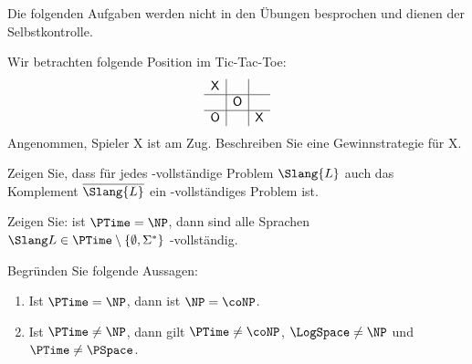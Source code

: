 \documentclass[german]{latteachCD}[2017/03/28]
\begin{document}
\maketitle

\begin{mdframed}
  Die folgenden Aufgaben werden nicht in den Übungen besprochen und dienen der
  Selbstkontrolle.

  \renewcommand{\theexercise}{\BoldGreek{exercise}}
  \setcounter{exercise}{5}

  \begin{exercise}
    Wir betrachten folgende Position im Tic-Tac-Toe:
    \begin{equation*}
      \begin{array}{c|c|c}
        \mathsf{X}&& \\\hline
                  &\mathsf{O}& \\\hline
        \mathsf{O}&&\mathsf{X}
      \end{array}
    \end{equation*}
    Angenommen, Spieler \textsf{X} ist am Zug.  Beschreiben Sie eine
    Gewinnstrategie für \textsf{X}.
  \end{exercise}

  \begin{exercise}
    Zeigen Sie, dass für jedes \PSpace-vollständige Problem $\Slang{L}$ auch das
    Komplement $\overline{\Slang{L}}$ ein \PSpace-vollständiges Problem ist.
  \end{exercise}

  \begin{exercise}
    Zeigen Sie: ist $\PTime = \NP$, dann sind alle Sprachen $\Slang L \in \PTime
    \setminus \{\emptyset, \Sigma^{*}\}$ \NP-vollständig.
  \end{exercise}

\end{mdframed}

\vspace*{0.5\baselineskip}

\setcounter{exercise}{0}

\enlargethispage{2\baselineskip}

\begin{exercise}
  Begründen Sie folgende Aussagen:
  \begin{enumerate}
  \item Ist $\PTime = \NP$, dann ist $\NP = \coNP$.
  \item Ist $\PTime \neq \NP$, dann gilt $\PTime \neq \coNP$, $\LogSpace \neq
    \NP$ und $\PTime \neq \PSpace$.
  \end{enumerate}
\end{exercise}
\end{document}
